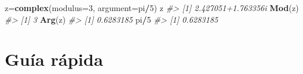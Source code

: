 \documentclass[
]{book}
\newenvironment{Shaded}{\begin{snugshade}}{\end{snugshade}}
\newcommand{\CommentTok}[1]{\textcolor[rgb]{0.56,0.35,0.01}{\textit{#1}}}
\newcommand{\DataTypeTok}[1]{\textcolor[rgb]{0.13,0.29,0.53}{#1}}
\newcommand{\DecValTok}[1]{\textcolor[rgb]{0.00,0.00,0.81}{#1}}
\newcommand{\KeywordTok}[1]{\textcolor[rgb]{0.13,0.29,0.53}{\textbf{#1}}}
\newcommand{\NormalTok}[1]{#1}
\newcommand{\OperatorTok}[1]{\textcolor[rgb]{0.81,0.36,0.00}{\textbf{#1}}}
\theoremstyle{definition}
\theoremstyle{definition}
\theoremstyle{definition}
\theoremstyle{remark}
\begin{document}
\begin{Shaded}
\begin{Highlighting}[]
\NormalTok{z=}\KeywordTok{complex}\NormalTok{(}\DataTypeTok{modulus=}\DecValTok{3}\NormalTok{, }\DataTypeTok{argument=}\NormalTok{pi}\OperatorTok{/}\DecValTok{5}\NormalTok{)}
\NormalTok{z}
\CommentTok{\#\textgreater{} [1] 2.427051+1.763356i}
\KeywordTok{Mod}\NormalTok{(z)}
\CommentTok{\#\textgreater{} [1] 3}
\KeywordTok{Arg}\NormalTok{(z)}
\CommentTok{\#\textgreater{} [1] 0.6283185}
\NormalTok{pi}\OperatorTok{/}\DecValTok{5}
\CommentTok{\#\textgreater{} [1] 0.6283185}
\end{Highlighting}
\end{Shaded}

\hypertarget{guuxeda-ruxe1pida-1}{%
\section{Guía rápida}\label{guuxeda-ruxe1pida-1}}
\end{document}
